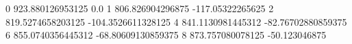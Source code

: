 0 923.880126953125 0.0
1 806.826904296875 -117.05322265625
2 819.5274658203125 -104.3526611328125
4 841.1130981445312 -82.76702880859375
6 855.0740356445312 -68.80609130859375
8 873.757080078125 -50.123046875
